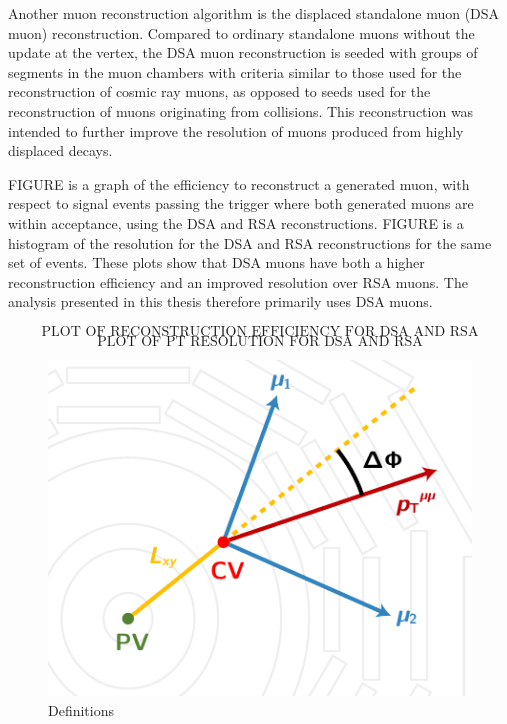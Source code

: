Another muon reconstruction algorithm is the displaced standalone muon (DSA muon) reconstruction.
Compared to ordinary standalone muons without the update at the vertex, the DSA muon reconstruction is seeded with groups of segments in the muon chambers with criteria similar to those used for the reconstruction of cosmic ray muons, as opposed to seeds used for the reconstruction of muons originating from \pp collisions.
This reconstruction was intended to further improve the \pT resolution of muons produced from highly displaced decays.

FIGURE is a graph of the efficiency to reconstruct a generated muon, with respect to signal events passing the trigger where both generated muons are within acceptance, using the DSA and RSA reconstructions.
FIGURE is a histogram of the \pT resolution for the DSA and RSA reconstructions for the same set of events. 
These plots show that DSA muons have both a higher reconstruction efficiency and an improved \pT resolution over RSA muons.
The analysis presented in this thesis therefore primarily uses DSA muons.

$$\text{PLOT OF RECONSTRUCTION EFFICIENCY FOR DSA AND RSA}$$
$$\text{PLOT OF PT RESOLUTION FOR DSA AND RSA}$$

\begin{figure}[htpb]
  \centering
  \includegraphics[width=.7\textwidth]{figures/displaced/LxyDef.pdf}
  \caption{Definitions}
  \label{fig:dd:LxyDef}
\end{figure}

